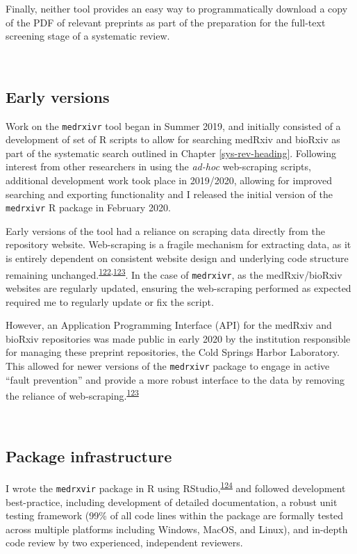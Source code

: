\documentclass[a4paper, twoside]{templates/ociamthesis}
\begin{document}
Finally, neither tool provides an easy way to programmatically download a copy of the PDF of relevant preprints as part of the preparation for the full-text screening stage of a systematic review.

~

\hypertarget{early-versions}{%
\subsection{Early versions}\label{early-versions}}

Work on the \texttt{medrxivr} tool began in Summer 2019, and initially consisted of a development of set of R scripts to allow for searching medRxiv and bioRxiv as part of the systematic search outlined in Chapter \ref{sys-rev-heading}. Following interest from other researchers in using the \emph{ad-hoc} web-scraping scripts, additional development work took place in 2019/2020, allowing for improved searching and exporting functionality and I released the initial version of the \texttt{medrxivr} R package in February 2020.

Early versions of the tool had a reliance on scraping data directly from the repository website. Web-scraping is a fragile mechanism for extracting data, as it is entirely dependent on consistent website design and underlying code structure remaining unchanged.\textsuperscript{\protect\hyperlink{ref-shaw2002}{122},\protect\hyperlink{ref-laprie1992}{123}}. In the case of \texttt{medrxivr}, as the medRxiv/bioRxiv websites are regularly updated, ensuring the web-scraping performed as expected required me to regularly update or fix the script.

However, an Application Programming Interface (API) for the medRxiv and bioRxiv repositories was made public in early 2020 by the institution responsible for managing these preprint repositories, the Cold Springs Harbor Laboratory. This allowed for newer versions of the \texttt{medrxivr} package to engage in active ``fault prevention'' and provide a more robust interface to the data by removing the reliance of web-scraping.\textsuperscript{\protect\hyperlink{ref-laprie1992}{123}}

~

\hypertarget{package-infrastructure}{%
\subsection{Package infrastructure}\label{package-infrastructure}}

I wrote the \texttt{medrxvir} package in R using RStudio,\textsuperscript{\protect\hyperlink{ref-rcoreteam2019}{124}} and followed development best-practice, including development of detailed documentation, a robust unit testing framework (99\% of all code lines within the package are formally tested across multiple platforms including Windows, MacOS, and Linux), and in-depth code review by two experienced, independent reviewers.
\end{document}
